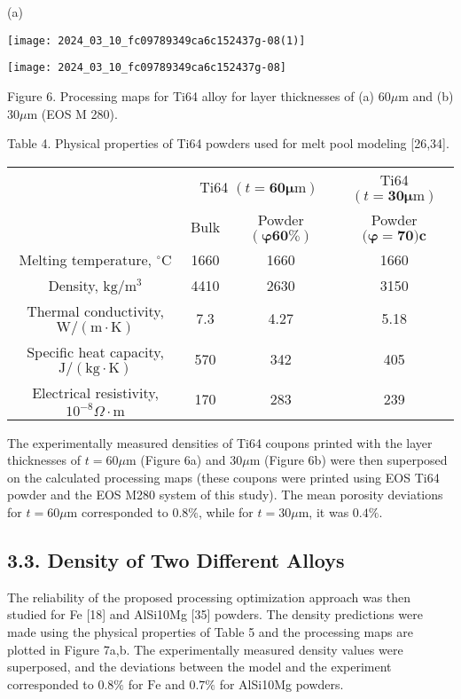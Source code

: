 \documentclass[10pt]{article}
\begin{document}
(a)

\begin{center}
\texttt{[image: 2024\_03\_10\_fc09789349ca6c152437g-08(1)]}
\end{center}

\begin{center}
\texttt{[image: 2024\_03\_10\_fc09789349ca6c152437g-08]}
\end{center}

Figure 6. Processing maps for Ti64 alloy for layer thicknesses of (a) $60 \mu \mathrm{m}$ and (b) $30 \mu \mathrm{m}$ (EOS M 280).

Table 4. Physical properties of Ti64 powders used for melt pool modeling [26,34].

\begin{center}
\begin{tabular}{cccc}
\hline
 & \multicolumn{2}{c}{Ti64 $(t=\mathbf{6 0} \boldsymbol{\mu \mathrm { m }})$} & Ti64 $(t=\mathbf{3 0} \boldsymbol{\mu \mathrm { m }})$ \\
\cline { 2 - 4 }
 & Bulk & Powder $(\boldsymbol{\varphi} \mathbf{6 0 \%})$ & Powder $(\boldsymbol{\varphi}=\mathbf{7 0} \mathbf{)} \mathbf{c}$ \\
\hline
Melting temperature, ${ }^{\circ} \mathrm{C}$ & 1660 & 1660 & 1660 \\
Density, $\mathrm{kg} / \mathrm{m}^{3}$ & 4410 & 2630 & 3150 \\
Thermal conductivity, $\mathrm{W} /(\mathrm{m} \cdot \mathrm{K})$ & 7.3 & 4.27 & 5.18 \\
Specific heat capacity, $\mathrm{J} /(\mathrm{kg} \cdot \mathrm{K})$ & 570 & 342 & 405 \\
Electrical resistivity, $10^{-8} \Omega \cdot \mathrm{m}$ & 170 & 283 & 239 \\
\hline
\end{tabular}
\end{center}

The experimentally measured densities of Ti64 coupons printed with the layer thicknesses of $t=60 \mu \mathrm{m}$ (Figure 6a) and $30 \mu \mathrm{m}$ (Figure 6b) were then superposed on the calculated processing maps (these coupons were printed using EOS Ti64 powder and the EOS M280 system of this study). The mean porosity deviations for $t=60 \mu \mathrm{m}$ corresponded to $0.8 \%$, while for $t=30 \mu \mathrm{m}$, it was $0.4 \%$.

\subsection*{3.3. Density of Two Different Alloys}
The reliability of the proposed processing optimization approach was then studied for Fe [18] and AlSi10Mg [35] powders. The density predictions were made using the physical properties of Table 5 and the processing maps are plotted in Figure 7a,b. The experimentally measured density values were superposed, and the deviations between the model and the experiment corresponded to $0.8 \%$ for $\mathrm{Fe}$ and $0.7 \%$ for AlSi10Mg powders.
\end{document}
